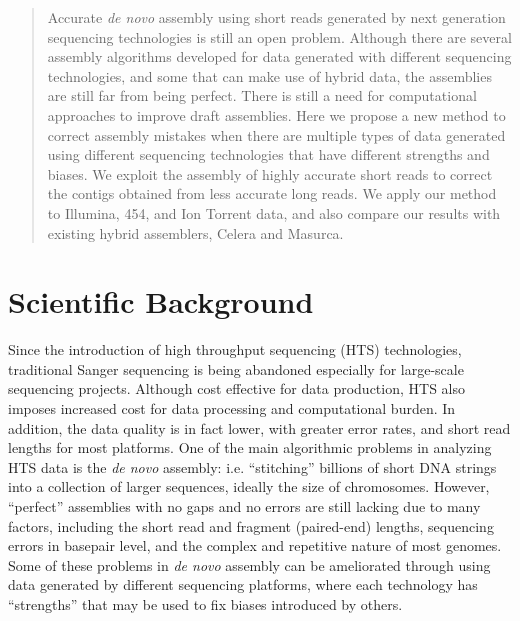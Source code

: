 \documentclass{llncs}
\begin{document}
\begin{abstract}
Accurate \textit{de novo} assembly using short reads generated by next generation sequencing technologies is still an open problem. Although there are several assembly algorithms developed for data generated with different sequencing technologies, and some that can make use of hybrid data, the assemblies are still far from being perfect. There is still a need for computational approaches to improve draft assemblies.
Here we propose a new method to correct assembly mistakes when there are multiple types of data generated using different sequencing technologies that have different strengths and biases. We exploit the assembly of highly accurate short reads to correct the contigs obtained from less accurate  long reads.
We apply our method to Illumina, 454, and Ion Torrent data, and also compare our results with existing hybrid assemblers, Celera and Masurca.
\end{abstract}
%
\section{Scientific Background}
Since the introduction of high throughput sequencing (HTS) technologies, traditional Sanger sequencing is being abandoned especially for large-scale sequencing projects.
Although cost effective for data production, HTS also imposes increased cost for data processing and computational burden. 
In addition, the data quality is in fact lower, with greater error rates, and short read lengths for most platforms. 
One of the main algorithmic problems in analyzing HTS data is the \textit{\textit{de novo}} assembly: i.e. ``stitching'' billions of short DNA strings into a collection of larger sequences, ideally the size of chromosomes. 
However, ``perfect'' assemblies with no gaps and no errors are still lacking due to many factors, including the short read and fragment (paired-end) lengths, sequencing errors in basepair level, and the complex and repetitive nature of most genomes. 
Some of these problems in \textit{de novo} assembly can be ameliorated through using data generated by different sequencing platforms, where each technology has ``strengths'' that may be used to fix biases introduced by others.
\end{document}
